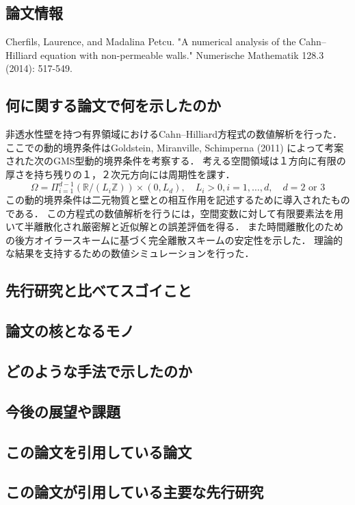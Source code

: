\documentclass[openary, a4paper, oneside]{jsarticle}
\begin{document}
  \subsection{論文情報}
  Cherfils, Laurence, and Madalina Petcu. "A numerical analysis of the Cahn–Hilliard equation with non-permeable walls." Numerische Mathematik 128.3 (2014): 517-549.
  \subsection{何に関する論文で何を示したのか}
  非透水性壁を持つ有界領域におけるCahn--Hilliard方程式の数値解析を行った．
  ここでの動的境界条件はGoldstein, Miranville, Schimperna (2011) \cite{GoldsteinMiranvilleSchimperna2011} によって考案された次のGMS型動的境界条件を考察する．
  考える空間領域は１方向に有限の厚さを持ち残りの１，２次元方向には周期性を課す．
  \begin{equation}
    \Omega=\Pi_{i=1}^{d-1}\left(\mathbb{R} /\left(L_{i} \mathbb{Z}\right)\right) \times\left(0, L_{d}\right), \quad L_{i}>0, i=1, \ldots, d, \quad d=2 \text { or } 3
  \end{equation}
  この動的境界条件は二元物質と壁との相互作用を記述するために導入されたものである．
  この方程式の数値解析を行うには，空間変数に対して有限要素法を用いて半離散化され厳密解と近似解との誤差評価を得る．
  また時間離散化のための後方オイラースキームに基づく完全離散スキームの安定性を示した．
  理論的な結果を支持するための数値シミュレーションを行った．
  \subsection{先行研究と比べてスゴイこと}
  \subsection{論文の核となるモノ}
  \subsection{どのような手法で示したのか}
  \subsection{今後の展望や課題}
  \subsection{この論文を引用している論文}
  \subsection{この論文が引用している主要な先行研究}

\newpage

\end{document}
